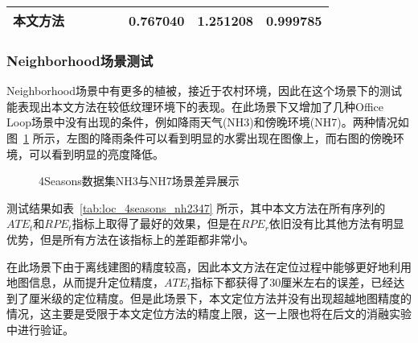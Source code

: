\begin{table}
\begin{tabular}{c|cccc|ccc}
本文方法               &                                                                                &                     &                     &                     & \cellcolor[HTML]{FA7F6F}\textbf{0.767040} & \cellcolor[HTML]{FA7F6F}\textbf{1.251208} & 0.999785          \\ \bottomrule
\end{tabular}
\label{tab:loc_4seasons_of345}
\end{table}

\subsubsection{Neighborhood场景测试}

Neighborhood场景中有更多的植被，接近于农村环境，因此在这个场景下的测试能表现出本文方法在较低纹理环境下的表现。在此场景下又增加了几种Office Loop场景中没有出现的条件，例如降雨天气(NH3)和傍晚环境(NH7)。两种情况如图~\ref{fig:scene_nh} 所示，左图的降雨条件可以看到明显的水雾出现在图像上，而右图的傍晚环境，可以看到明显的亮度降低。

\begin{figure}
  \centering
  \caption{4Seasons数据集NH3与NH7场景差异展示}
  \label{fig:scene_nh}
\end{figure}


测试结果如表~\ref{tab:loc_4seasons_nh2347} 所示，其中本文方法在所有序列的$ATE_t$和$RPE_t$指标上取得了最好的效果，但是在$RPE_r$依旧没有比其他方法有明显优势，但是所有方法在该指标上的差距都非常小。

在此场景下由于离线建图的精度较高，因此本文方法在定位过程中能够更好地利用地图信息，从而提升定位精度，$ATE_t$指标下都获得了30厘米左右的误差，已经达到了厘米级的定位精度。但是此场景下，本文定位方法并没有出现超越地图精度的情况，这主要是受限于本文定位方法的精度上限，这一上限也将在后文的消融实验中进行验证。

